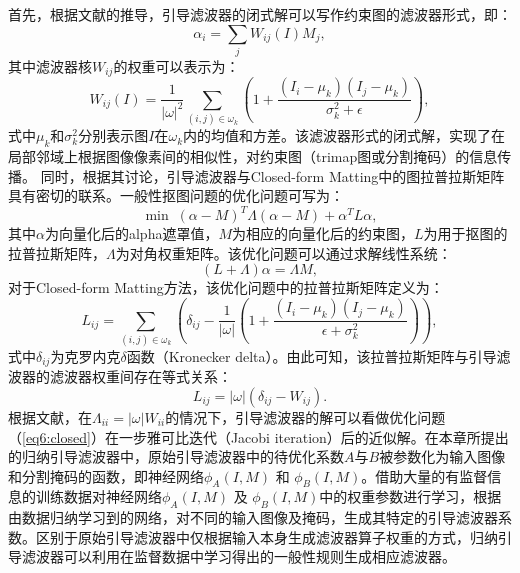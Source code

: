 首先，根据文献\parencite{he2010guided}的推导，引导滤波器的闭式解可以写作约束图的滤波器形式，即：
\begin{equation}
	\alpha_i = \sum_j W_{ij}(I)M_j,
\end{equation}
其中滤波器核$W_{ij}$的权重可以表示为：
\begin{equation}
	W_{ij}(I) = \frac{1}{|\omega|^2} \sum_{(i,j)\in \omega_k}(1+\frac{(I_i-\mu_k)(I_j-\mu_k)}{\sigma^2_k+\epsilon}),
\end{equation}
式中$\mu_k$和$\sigma^2_k$分别表示图$I$在$\omega_k$内的均值和方差。该滤波器形式的闭式解，实现了在局部邻域上根据图像像素间的相似性，对约束图（trimap图或分割掩码）的信息传播。
同时，根据其讨论，引导滤波器与Closed-form Matting\cite{levin2008closed}中的图拉普拉斯矩阵具有密切的联系。一般性抠图问题的优化问题可写为：
\begin{equation}
	\mathop{\mathrm{min}}\; (\alpha-M)^T\Lambda(\alpha-M)+\alpha^T L\alpha,
	\label{eq6:closed}
\end{equation}
其中$\alpha$为向量化后的alpha遮罩值，$M$为相应的向量化后的约束图，$L$为用于抠图的拉普拉斯矩阵，$\Lambda$为对角权重矩阵。该优化问题可以通过求解线性系统：
\begin{equation}
	(L+\Lambda)\alpha=\Lambda M,
\end{equation}
对于Closed-form Matting方法，该优化问题中的拉普拉斯矩阵定义为：
\begin{equation}
	L_{ij} = \sum_{(i,j)\in \omega_k}(\delta_{ij}-\frac{1}{|\omega|} (1+\frac{(I_i-\mu_k)(I_j-\mu_k)}{\epsilon+\sigma^2_k})),
\end{equation}
式中$\delta_{ij}$为克罗内克$\delta$函数（Kronecker delta）。由此可知，该拉普拉斯矩阵与引导滤波器的滤波器权重间存在等式关系：
\begin{equation}
	L_{ij}=|\omega|(\delta_{ij}-W_{ij}).
\end{equation}
根据文献\parencite{he2010guided}，在$\Lambda_{ii}=|\omega|W_{ii}$的情况下，引导滤波器的解可以看做优化问题（\ref{eq6:closed}）在一步雅可比迭代（Jacobi iteration）后的近似解。在本章所提出的归纳引导滤波器中，原始引导滤波器中的待优化系数$A$与$B$被参数化为输入图像和分割掩码的函数，即神经网络$ \phi_{A}(I, M) $ 和 $ \phi_{B}(I, M) $。借助大量的有监督信息的训练数据对神经网络$ \phi_{A}(I, M) $ 及 $ \phi_{B}(I, M) $中的权重参数进行学习，根据由数据归纳学习到的网络，对不同的输入图像及掩码，生成其特定的引导滤波器系数。区别于原始引导滤波器中仅根据输入本身生成滤波器算子权重的方式，归纳引导滤波器可以利用在监督数据中学习得出的一般性规则生成相应滤波器。

